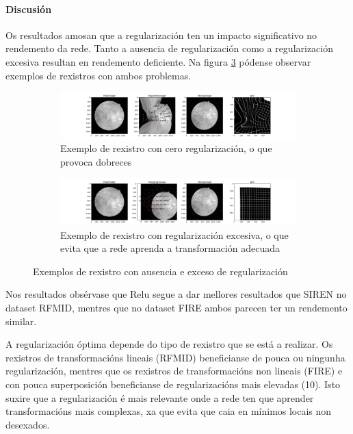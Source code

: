 \FloatBarrier

\paragraph{Discusión}
\label{par:Discusion-regularization}

Os resultados amosan que a regularización ten un impacto significativo no rendemento da rede. Tanto a ausencia de regularización como a regularización excesiva resultan en rendemento deficiente.
Na figura \ref{fig:regularization_examples} pódense observar exemplos de rexistros con ambos problemas.

\begin{figure}[ht]
    \centering
    \begin{subfigure}[b]{0.45\textwidth}
        \centering
        \includegraphics[width=\textwidth]{imaxes/reg_examples/no_reg_example.png}
        \caption{Exemplo de rexistro con cero regularización, o que provoca dobreces}
        \label{fig:no_reg_example}
    \end{subfigure}\hfill
    \begin{subfigure}[b]{0.45\textwidth}
        \centering
        \includegraphics[width=\textwidth]{imaxes/reg_examples/too_much_reg_example.png}
        \caption{Exemplo de rexistro con regularización excesiva, o que evita que a rede aprenda a transformación adecuada}
        \label{fig:too_much_reg_example}
    \end{subfigure}
    \caption{Exemplos de rexistro con ausencia e exceso de regularización}
    \label{fig:regularization_examples}
\end{figure}

Nos resultados obsérvase que Relu segue a dar mellores resultados que SIREN no dataset RFMID, mentres que no dataset FIRE ambos parecen ter un rendemento similar.

A regularización óptima depende do tipo de rexistro que se está a realizar. Os rexistros de transformacións lineais (RFMID) beneficianse de pouca ou ningunha regularización, mentres que os rexistros de transformacións non lineais (FIRE) e con pouca superposición beneficianse de regularizacións mais elevadas (10).
Isto suxire que a regularización é mais relevante onde a rede ten que aprender transformacións mais complexas, xa que evita que caia en mínimos locais non desexados.

